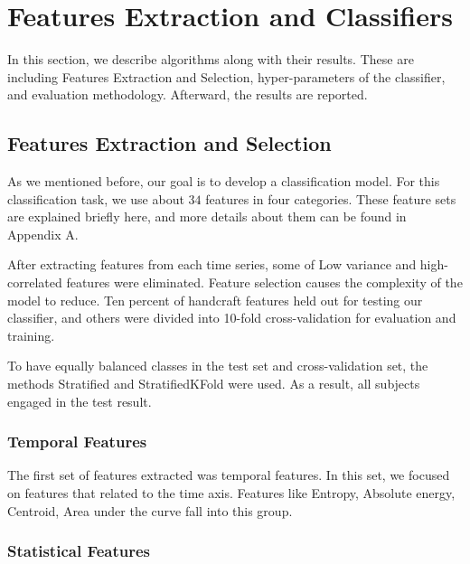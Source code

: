 \section{Features Extraction and Classifiers}

In this section, we describe algorithms along with their results. These are including Features Extraction and Selection, hyper-parameters of the classifier, and evaluation methodology. Afterward, the results are reported.

\subsection{Features Extraction and Selection}

As we mentioned before, our goal is to develop a classification model. For this classification task, we use about $34$ features in four categories. These feature sets are explained briefly here, and more details about them can be found in Appendix A.

After extracting features from each time series, some of Low variance and high-correlated features were eliminated. Feature selection causes the complexity of the model to reduce. Ten percent of handcraft features held out for testing our classifier, and others were divided into 10-fold cross-validation for evaluation and training. 

To have equally balanced classes in the test set and cross-validation set, the methods Stratified and StratifiedKFold were used. As a result, all subjects engaged in the test result. %
 
\subsubsection{Temporal Features}

The first set of features extracted was temporal features. In this set, we focused on features that related to the time axis. Features like Entropy, Absolute energy, Centroid, Area under the curve fall into this group. 

\subsubsection{Statistical Features}

